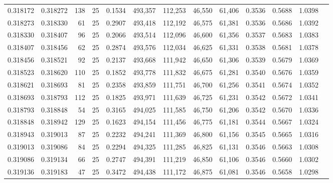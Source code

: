 \begin{tabular}{rrrrrrrrrrrrr}
0.318172 & 0.318272 &   138 &  25 &                                     0.1534 & 493,357 & 112,253 &  46,550 &  61,406 & 0.3536 & 0.5688 & 1.0398 \\
0.318273 & 0.318330 &    61 &  25 &                                     0.2907 & 493,418 & 112,192 &  46,575 &  61,381 & 0.3536 & 0.5686 & 1.0392 \\
0.318330 & 0.318407 &    96 &  25 &                                     0.2066 & 493,514 & 112,096 &  46,600 &  61,356 & 0.3537 & 0.5683 & 1.0383 \\
0.318407 & 0.318456 &    62 &  25 &                                     0.2874 & 493,576 & 112,034 &  46,625 &  61,331 & 0.3538 & 0.5681 & 1.0378 \\
0.318456 & 0.318521 &    92 &  25 &                                     0.2137 & 493,668 & 111,942 &  46,650 &  61,306 & 0.3539 & 0.5679 & 1.0369 \\
0.318523 & 0.318620 &   110 &  25 &                                     0.1852 & 493,778 & 111,832 &  46,675 &  61,281 & 0.3540 & 0.5676 & 1.0359 \\
0.318621 & 0.318693 &    81 &  25 &                                     0.2358 & 493,859 & 111,751 &  46,700 &  61,256 & 0.3541 & 0.5674 & 1.0352 \\
0.318693 & 0.318793 &   112 &  25 &                                     0.1825 & 493,971 & 111,639 &  46,725 &  61,231 & 0.3542 & 0.5672 & 1.0341 \\
0.318793 & 0.318848 &    54 &  25 &                                     0.3165 & 494,025 & 111,585 &  46,750 &  61,206 & 0.3542 & 0.5670 & 1.0336 \\
0.318848 & 0.318942 &   129 &  25 &                                     0.1623 & 494,154 & 111,456 &  46,775 &  61,181 & 0.3544 & 0.5667 & 1.0324 \\
0.318943 & 0.319013 &    87 &  25 &                                     0.2232 & 494,241 & 111,369 &  46,800 &  61,156 & 0.3545 & 0.5665 & 1.0316 \\
0.319013 & 0.319086 &    84 &  25 &                                     0.2294 & 494,325 & 111,285 &  46,825 &  61,131 & 0.3546 & 0.5663 & 1.0308 \\
0.319086 & 0.319134 &    66 &  25 &                                     0.2747 & 494,391 & 111,219 &  46,850 &  61,106 & 0.3546 & 0.5660 & 1.0302 \\
0.319136 & 0.319183 &    47 &  25 &                                     0.3472 & 494,438 & 111,172 &  46,875 &  61,081 & 0.3546 & 0.5658 & 1.0298 \\

\end{tabular}
